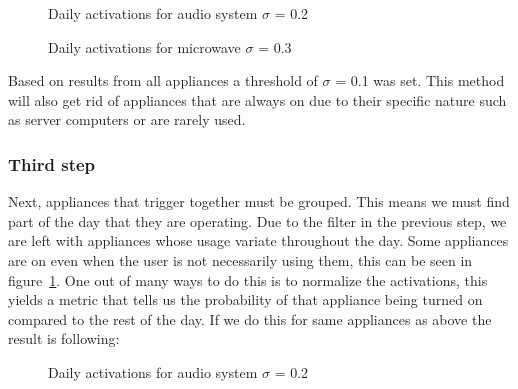 \begin{figure}[H]
    \centering
    \caption{Daily activations for audio system $\sigma$ = 0.2}
    \label{arr:as_acts}
\end{figure}

\begin{figure}[H]
    \centering
    \caption{Daily activations for microwave $\sigma$ = 0.3}
    \label{arr:microwave_acts}
\end{figure}

Based on results from all appliances a threshold of $\sigma$ = 0.1 was set.
This method will also get rid of appliances that are always on due to their specific nature such as server computers 
or are rarely used. 

\subsubsection{Third step}

Next, appliances that trigger together must be grouped. 
This means we must find part of the day that they are operating.
Due to the filter in the previous step, we are left with appliances whose usage variate throughout the day. 
Some appliances are on even when the user is not necessarily using them, this can be seen in figure \ref{arr:as_acts}.
One out of many ways to do this is to normalize the activations, this yields a metric that tells us the probability of that appliance being turned on compared to the rest of the day. 
If we do this for same appliances as above the result is following: 

\begin{figure}[H]
    \centering
    \caption{Daily activations for audio system $\sigma$ = 0.2}
    \label{arr:as_acts_norm}
\end{figure}

